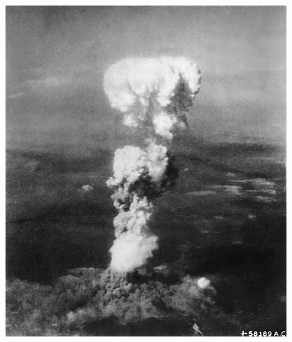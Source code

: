 \documentclass[11pt,a4j,twocolumn]{jarticle}
\begin{document}
\vfill
\noindent
\centerline{\includegraphics[width=\columnwidth,bb=0 0 408 1]{hiroshima.jpg}}
\end{document}
